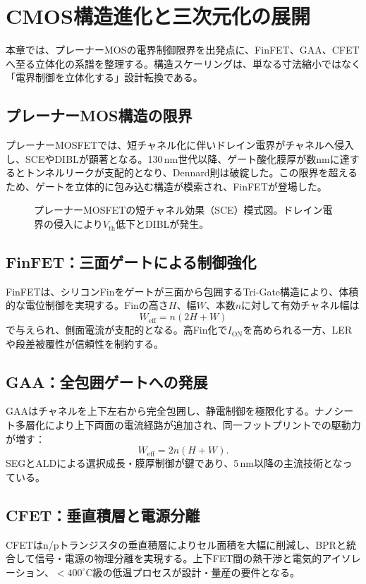 
\section{CMOS構造進化と三次元化の展開}
本章では、プレーナーMOSの電界制御限界を出発点に、FinFET、GAA、CFETへ至る立体化の系譜を整理する。構造スケーリングは、単なる寸法縮小ではなく「電界制御を立体化する」設計転換である。

\subsection{プレーナーMOS構造の限界}
プレーナーMOSFETでは、短チャネル化に伴いドレイン電界がチャネルへ侵入し、SCEやDIBLが顕著となる。130\,nm世代以降、ゲート酸化膜厚が数\si{\nano\meter}に達するとトンネルリークが支配的となり、Dennard則は破綻した。この限界を超えるため、ゲートを立体的に包み込む構造が模索され、FinFETが登場した。

\begin{figure}[t]
  \centering
  \caption{プレーナーMOSFETの短チャネル効果（SCE）模式図。ドレイン電界の侵入により$V_\mathrm{th}$低下とDIBLが発生。}
  \label{fig:planar_sce}
\end{figure}

\subsection{FinFET：三面ゲートによる制御強化}
FinFETは、シリコンFinをゲートが三面から包囲するTri-Gate構造により、体積的な電位制御を実現する。Finの高さ$H$、幅$W$、本数$n$に対して有効チャネル幅は
\[
W_{\mathrm{eff}} = n(2H + W)
\]
で与えられ、側面電流が支配的となる。高Fin化で$I_\mathrm{ON}$を高められる一方、LERや段差被覆性が信頼性を制約する。

\subsection{GAA：全包囲ゲートへの発展}
GAAはチャネルを上下左右から完全包囲し、静電制御を極限化する。ナノシート多層化により上下両面の電流経路が追加され、同一フットプリントでの駆動力が増す：
\[
W_{\mathrm{eff}} = 2n(H + W).
\]
SEGとALDによる選択成長・膜厚制御が鍵であり、5\,nm以降の主流技術となっている。

\subsection{CFET：垂直積層と電源分離}
CFETはn/pトランジスタの垂直積層によりセル面積を大幅に削減し、BPRと統合して信号・電源の物理分離を実現する。上下FET間の熱干渉と電気的アイソレーション、$\!<\!400^\circ$C級の低温プロセスが設計・量産の要件となる。

